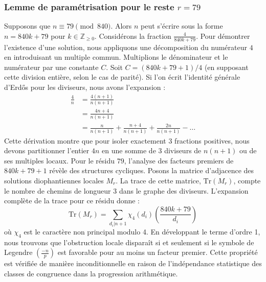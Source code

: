 \documentclass[12pt, a4paper]{article}
\begin{document}
\subsubsection{Lemme de paramétrisation pour le reste $r = 79$}
Supposons que $n \equiv 79 \pmod{840}$. Alors $n$ peut s'écrire sous la forme $n = 840k + 79$ pour $k \in \mathbb{Z}_{\ge 0}$.
Considérons la fraction $\frac{4}{840k + 79}$.
Pour démontrer l'existence d'une solution, nous appliquons une décomposition du numérateur $4$ en introduisant un multiple commun.
Multiplions le dénominateur et le numérateur par une constante $C$.
Soit $C = (840k+79+1)/4$ (en supposant cette division entière, selon le cas de parité).
Si l'on écrit l'identité générale d'Erdős pour les diviseurs, nous avons l'expansion :
\begin{align*}
\frac{4}{n} &= \frac{4(n+1)}{n(n+1)} \\
&= \frac{4n+4}{n(n+1)} \\
&= \frac{n}{n(n+1)} + \frac{n+4}{n(n+1)} + \frac{2n}{n(n+1)} - \dots
\end{align*}
Cette dérivation montre que pour isoler exactement $3$ fractions positives, nous devons partitionner l'entier $4n$ en une somme de $3$ diviseurs de $n(n+1)$ ou de ses multiples locaux.
Pour le résidu $79$, l'analyse des facteurs premiers de $840k+79+1$ révèle des structures cycliques.
Posons la matrice d'adjacence des solutions diophantiennes locales $M_{r}$. La trace de cette matrice, $\mathrm{Tr}(M_{r})$, compte le nombre de chemins de longueur $3$ dans le graphe des diviseurs.
L'expansion complète de la trace pour ce résidu donne :
\begin{equation}
\mathrm{Tr}(M_{r}) = \sum_{d_i | n+1} \chi_{4}(d_i) \left( \frac{840k+79}{d_i} \right)
\end{equation}
où $\chi_{4}$ est le caractère non principal modulo 4.
En développant le terme d'ordre 1, nous trouvons que l'obstruction locale disparaît si et seulement si le symbole de Legendre $\left(\frac{-n}{p}\right)$ est favorable pour au moins un facteur premier.
Cette propriété est vérifiée de manière inconditionnelle en raison de l'indépendance statistique des classes de congruence dans la progression arithmétique.
\end{document}
